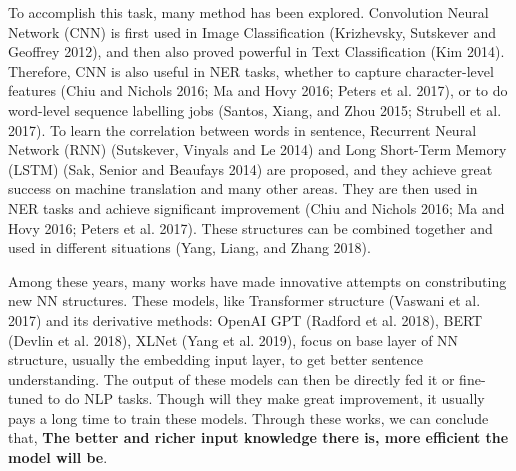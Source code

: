\documentclass[letterpaper]{article} %
\begin{document}
To accomplish this task, many method has been explored.  Convolution Neural Network (CNN) is first used in Image Classification (Krizhevsky, Sutskever and Geoffrey 2012), and then also proved powerful in Text Classification (Kim 2014). Therefore, CNN is also useful in NER tasks, whether to capture character-level features (Chiu and Nichols 2016; Ma and Hovy 2016; Peters et al. 2017), or to do word-level sequence labelling jobs (Santos, Xiang, and Zhou 2015; Strubell et al. 2017). To learn the correlation between words in sentence, Recurrent Neural Network (RNN) (Sutskever, Vinyals and Le 2014) and Long Short-Term Memory (LSTM)  (Sak, Senior and Beaufays 2014) are proposed, and they achieve great success on machine translation and many other areas. They are then used in NER tasks and achieve significant improvement (Chiu and Nichols 2016; Ma and Hovy 2016; Peters et al. 2017). These structures can be combined together and used in different situations (Yang, Liang, and Zhang 2018).

Among these years, many works have made innovative attempts on constributing new NN structures. These models, like Transformer structure (Vaswani et al. 2017) and its derivative methods: OpenAI GPT (Radford et al. 2018), BERT (Devlin et al. 2018), XLNet (Yang et al. 2019), focus on base layer of NN structure, usually the embedding input layer, to get better sentence understanding. The output of these models can then be directly fed it or fine-tuned to do NLP tasks. Though will they make great improvement, it usually pays a long time to train these models. Through these works, we can conclude that, \textbf{The better and richer input knowledge there is, more efficient the model will be}. 
\end{document}
